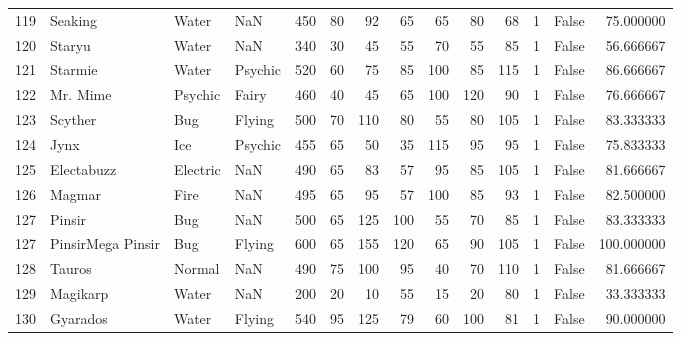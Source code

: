\begin{tabular}{rlllrrrrrrrrlr}
 119 &                    Seaking &     Water &       NaN &    450 &   80 &      92 &       65 &       65 &       80 &     68 &           1 &      False &   75.000000 \\
 120 &                     Staryu &     Water &       NaN &    340 &   30 &      45 &       55 &       70 &       55 &     85 &           1 &      False &   56.666667 \\
 121 &                    Starmie &     Water &   Psychic &    520 &   60 &      75 &       85 &      100 &       85 &    115 &           1 &      False &   86.666667 \\
 122 &                   Mr. Mime &   Psychic &     Fairy &    460 &   40 &      45 &       65 &      100 &      120 &     90 &           1 &      False &   76.666667 \\
 123 &                    Scyther &       Bug &    Flying &    500 &   70 &     110 &       80 &       55 &       80 &    105 &           1 &      False &   83.333333 \\
 124 &                       Jynx &       Ice &   Psychic &    455 &   65 &      50 &       35 &      115 &       95 &     95 &           1 &      False &   75.833333 \\
 125 &                 Electabuzz &  Electric &       NaN &    490 &   65 &      83 &       57 &       95 &       85 &    105 &           1 &      False &   81.666667 \\
 126 &                     Magmar &      Fire &       NaN &    495 &   65 &      95 &       57 &      100 &       85 &     93 &           1 &      False &   82.500000 \\
 127 &                     Pinsir &       Bug &       NaN &    500 &   65 &     125 &      100 &       55 &       70 &     85 &           1 &      False &   83.333333 \\
 127 &          PinsirMega Pinsir &       Bug &    Flying &    600 &   65 &     155 &      120 &       65 &       90 &    105 &           1 &      False &  100.000000 \\
 128 &                     Tauros &    Normal &       NaN &    490 &   75 &     100 &       95 &       40 &       70 &    110 &           1 &      False &   81.666667 \\
 129 &                   Magikarp &     Water &       NaN &    200 &   20 &      10 &       55 &       15 &       20 &     80 &           1 &      False &   33.333333 \\
 130 &                   Gyarados &     Water &    Flying &    540 &   95 &     125 &       79 &       60 &      100 &     81 &           1 &      False &   90.000000 \\

\end{tabular}
